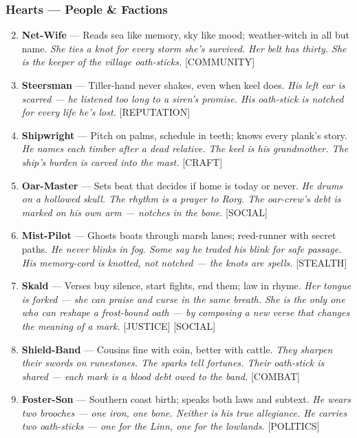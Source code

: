 \subsubsection*{Hearts --- People \& Factions}
\label{sec:linn-people}
\begin{enumerate}
\setcounter{enumi}{1}
\item \textbf{Net-Wife} --- Reads sea like memory, sky like mood; weather-witch in all but name.
  \hfill \textit{She ties a knot for every storm she's survived. Her belt has thirty. She is the keeper of the village oath-sticks.} [COMMUNITY]
\item \textbf{Steersman} --- Tiller-hand never shakes, even when keel does.
  \hfill \textit{His left ear is scarred --- he listened too long to a siren's promise. His oath-stick is notched for every life he's lost.} [REPUTATION]
\item \textbf{Shipwright} --- Pitch on palms, schedule in teeth; knows every plank's story.
  \hfill \textit{He names each timber after a dead relative. The keel is his grandmother. The ship's burden is carved into the mast.} [CRAFT]
\item \textbf{Oar-Master} --- Sets beat that decides if home is today or never.
  \hfill \textit{He drums on a hollowed skull. The rhythm is a prayer to Rorg. The oar-crew's debt is marked on his own arm --- notches in the bone.} [SOCIAL]
\item \textbf{Mist-Pilot} --- Ghosts boats through marsh lanes; reed-runner with secret paths.
  \hfill \textit{He never blinks in fog. Some say he traded his blink for safe passage. His memory-cord is knotted, not notched --- the knots are spells.} [STEALTH]
\item \textbf{Skald} --- Verses buy silence, start fights, end them; law in rhyme.
  \hfill \textit{Her tongue is forked --- she can praise and curse in the same breath. She is the only one who can reshape a frost-bound oath --- by composing a new verse that changes the meaning of a mark.} [JUSTICE] [SOCIAL]
\item \textbf{Shield-Band} --- Cousins fine with coin, better with cattle.
  \hfill \textit{They sharpen their swords on runestones. The sparks tell fortunes. Their oath-stick is shared --- each mark is a blood debt owed to the band.} [COMBAT]
\item \textbf{Foster-Son} --- Southern coast birth; speaks both laws and subtext.
  \hfill \textit{He wears two brooches --- one iron, one bone. Neither is his true allegiance. He carries two oath-sticks --- one for the Linn, one for the lowlands.} [POLITICS]

\end{enumerate}
